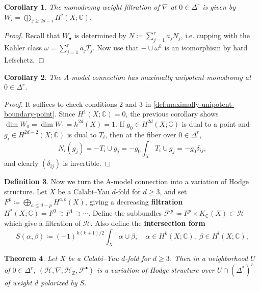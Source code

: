 \documentclass{report}
\theoremstyle{plain}
\newtheorem{theorem}{Theorem}[section]
\newtheorem{corollary}[theorem]{Corollary}
\theoremstyle{definition}
\newtheorem{definition}[theorem]{Definition}
\theoremstyle{remark}
\newcommand{\bC}{\mathbb{C}}
\newcommand{\bZ}{\mathbb{Z}}
\newcommand{\cF}{\mathcal{F}}
\newcommand{\cH}{\mathcal{H}}
\begin{document}
\begin{corollary}
  The monodromy weight filtration of $\nabla$ at $0 \in \Delta^r$ is
  given by $W_i = \bigoplus_{j \ge 2d-i} H^j(X; \bC)$.
\end{corollary}

\begin{proof}
  Recall that $W_\bullet$ is determined by $N \coloneqq \sum_{j=1}^r
  a_j N_j$, i.e. cupping with the K\"ahler class $\omega =
  \sum_{j=1}^r a_j T_j$. Now use that $- \cup \omega^k$ is an
  isomorphism by hard Lefschetz.
\end{proof}

\begin{corollary}
  The A-model connection has maximally unipotent monodromy at $0 \in
  \Delta^r$.
\end{corollary}

\begin{proof}
  It suffices to check conditions 2 and 3 in
  \ref{def:maximally-unipotent-boundary-point}. Since $H^1(X; \bC) =
  0$, the previous corollary shows $\dim W_0 = \dim W_1 = h^{2d}(X) =
  1$. If $g_0 \in H^{2d}(X; \bC)$ is dual to a point and $g_i \in
  H^{2d-2}(X; \bC)$ is dual to $T_i$, then at the fiber over $0 \in
  \Delta^r$,
  \[ N_i(g_j) = -T_i \cup g_j = -g_0 \int_X T_i \cup g_j = -g_0 \delta_{ij}, \]
  and clearly $(\delta_{ij})$ is invertible.
\end{proof}

\begin{definition}
  Now we turn the A-model connection into a variation of Hodge
  structure. Let $X$ be a Calabi--Yau $d$-fold for $d \ge 3$, and set
  $F^p \coloneqq \bigoplus_{a\le d-p} H^{a,b}(X)$, giving a decreasing
  {\bf filtration} $H^*(X; \bC) = F^0 \supset F^1 \supset \cdots$.
  Define the subbundles $\cF^p \coloneqq F^p \times K_{\bC}(X) \subset
  \cH$ which give a filtration of $\cH$. Also define the {\bf
    intersection form}
  \[ S(\alpha, \beta) \coloneqq (-1)^{k(k+1)/2} \int_X \alpha \cup \beta, \quad \alpha \in H^k(X; \bC), \; \beta \in H^l(X; \bC), \]
\end{definition}

\begin{theorem} \cite[Theorem 8.5.11]{Cox1999}
  Let $X$ be a Calabi--Yau $d$-fold for $d \ge 3$. Then in a
  neighborhood $U$ of $0 \in \Delta^r$, $(\cH, \nabla, \cH_{\bZ},
  \cF^\bullet)$ is a variation of Hodge structure over $U \cap
  (\Delta^*)^r$ of weight $d$ polarized by $S$.
\end{theorem}
\end{document}

